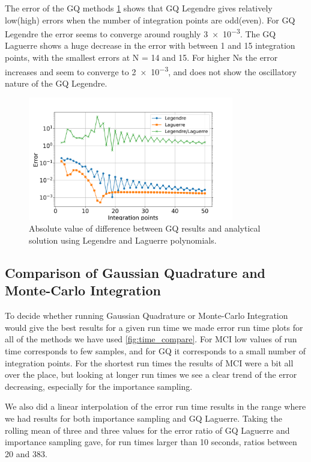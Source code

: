 The error of the GQ methods \cref{fig:gauss_error} shows that GQ Legendre gives
relatively low(high) errors when the number of integration points are odd(even).
For GQ Legendre the error seems to converge around roughly \num{ 3e-3}. The GQ Laguerre shows
a huge decrease in the error with between 1 and 15 integration points, with
the smallest errors at N = 14 and 15. For higher Ns the error
increases and seem to converge to \num{2e-3}, and does not show the oscillatory
nature of the GQ Legendre.

\begin{figure}[H]
  \centering
  \includegraphics[width=0.8\textwidth]{../figures/gauss_error.png}
  \caption{Absolute value of difference between GQ results and analytical
  solution using Legendre and Laguerre polynomials.}

  \label{fig:gauss_error}
\end{figure}


\subsection{Comparison of Gaussian Quadrature and Monte-Carlo Integration}

To decide whether running Gaussian Quadrature or Monte-Carlo Integration would
give the best results for a given run time we made error run time plots for all
of the methods we have used \cref{fig:time_compare}. For MCI low values of run time
corresponds to few samples, and for GQ it corresponds to a small number of integration points.
For the shortest run times the results of MCI were a bit all over the place, but
looking at longer run times we see a clear trend of the error decreasing, especially
for the importance sampling.

We also did a linear interpolation of the error run time results in the range
where we had results for both importance sampling and GQ Laguerre. Taking the rolling
mean of three and three values for the error ratio of GQ Laguerre and importance sampling
gave, for run times larger than 10 seconds, ratios between 20 and 383.

